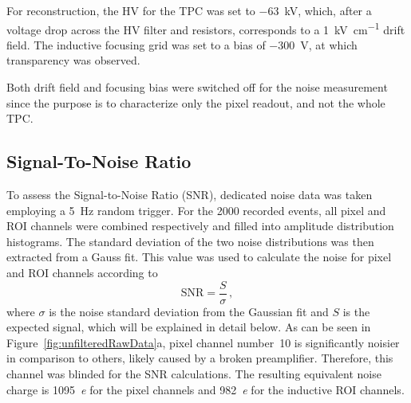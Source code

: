 \documentclass[instruments,article,accept,moreauthors,pdftex]{Definitions/mdpi}
\newcommand*{\m}{\mathrm}
\begin{document}
For reconstruction, the HV for the TPC was set to \SI{-63}{\kilo\volt}, which, after a voltage drop across the HV filter and resistors, corresponds to a \SI{1}{\kilo\volt\per\centi\meter} drift field. The inductive focusing grid was set to a bias of \SI{-300}{\volt}, at which transparency was observed. 

Both drift field and focusing bias were switched off for the noise measurement since the purpose is to characterize only the pixel readout, and not the whole TPC.


\subsection{Signal-To-Noise Ratio}

To assess the Signal-to-Noise Ratio (SNR), dedicated noise data was taken employing a \SI{5}{\hertz} random trigger.
For the \num{2000} recorded events, all pixel and ROI channels were combined respectively and filled into amplitude distribution histograms.
The standard deviation of the two noise distributions was then extracted from a Gauss fit.
This value was used to calculate the noise for pixel and ROI channels according to
\begin{equation}
\m{SNR} = \frac{S}{\sigma}\,\m{,}
\label{eq:snr}
\end{equation}
where $\sigma$ is the noise standard deviation from the Gaussian fit and $S$ is the expected signal, which will be explained in detail below.
As can be seen in Figure~\ref{fig:unfilteredRawData}a, pixel channel number~\num{10} is significantly noisier in comparison to others, likely caused by a broken preamplifier.
Therefore, this channel was blinded for the SNR calculations.
The resulting equivalent noise charge is \SI{1095}{\elementarycharge} for the pixel channels and \SI{982}{\elementarycharge} for the inductive ROI channels.
\end{document}
